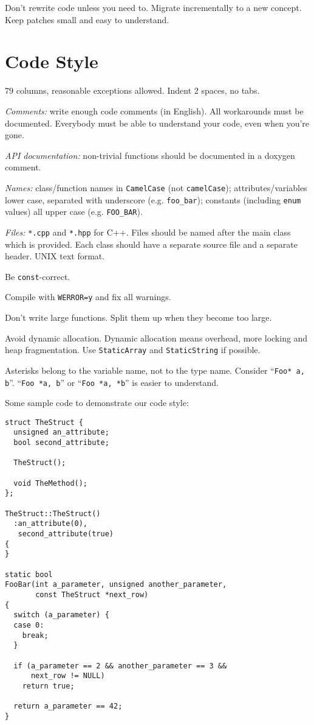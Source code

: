 \documentclass[a4paper,12pt]{refrep}
\begin{document}
Don't rewrite code unless you need to.  Migrate incrementally to a new
concept.  Keep patches small and easy to understand.

\section{Code Style}

79 columns, reasonable exceptions allowed.  Indent 2 spaces, no tabs.

\emph{Comments:} write enough code comments (in English).  All
workarounds must be documented.  Everybody must be able to understand
your code, even when you're gone.

\emph{API documentation:} non-trivial functions should be documented
in a doxygen comment.

\emph{Names:} class/function names in \texttt{CamelCase} (not
\texttt{camelCase}); attributes/variables lower case, separated with
underscore (e.g. \texttt{foo\_bar}); constants (including
\texttt{enum} values) all upper case (e.g. \texttt{FOO\_BAR}).

\emph{Files:} \texttt{*.cpp} and \texttt{*.hpp} for C++.  Files should
be named after the main class which is provided.  Each class should
have a separate source file and a separate header.  UNIX text format.

Be \texttt{const}-correct.

Compile with \texttt{WERROR=y} and fix all warnings.

Don't write large functions.  Split them up when they become too
large.

Avoid dynamic allocation.  Dynamic allocation means overhead, more
locking and heap fragmentation.  Use \texttt{StaticArray} and
\texttt{StaticString} if possible.

Asterisks belong to the variable name, not to the type name.  Consider
``\texttt{Foo* a, b}''.  ``\texttt{Foo *a, b}'' or ``\texttt{Foo *a,
  *b}'' is easier to understand.

Some sample code to demonstrate our code style:

\begin{verbatim}
struct TheStruct {
  unsigned an_attribute;
  bool second_attribute;

  TheStruct();

  void TheMethod();
};

TheStruct::TheStruct()
  :an_attribute(0),
   second_attribute(true)
{
}

static bool
FooBar(int a_parameter, unsigned another_parameter,
       const TheStruct *next_row)
{
  switch (a_parameter) {
  case 0:
    break;
  }

  if (a_parameter == 2 && another_parameter == 3 &&
      next_row != NULL)
    return true;

  return a_parameter == 42;
}
\end{verbatim}
\end{document}
